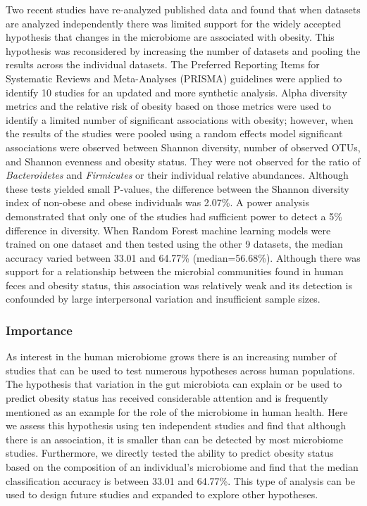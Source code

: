\documentclass[12pt,]{article}
\begin{document}
Two recent studies have re-analyzed published data and found that when
datasets are analyzed independently there was limited support for the
widely accepted hypothesis that changes in the microbiome are associated
with obesity. This hypothesis was reconsidered by increasing the number
of datasets and pooling the results across the individual datasets. The
Preferred Reporting Items for Systematic Reviews and Meta-Analyses
(PRISMA) guidelines were applied to identify 10 studies for an updated
and more synthetic analysis. Alpha diversity metrics and the relative
risk of obesity based on those metrics were used to identify a limited
number of significant associations with obesity; however, when the
results of the studies were pooled using a random effects model
significant associations were observed between Shannon diversity, number
of observed OTUs, and Shannon evenness and obesity status. They were not
observed for the ratio of \emph{Bacteroidetes} and \emph{Firmicutes} or
their individual relative abundances. Although these tests yielded small
P-values, the difference between the Shannon diversity index of
non-obese and obese individuals was 2.07\%. A power analysis
demonstrated that only one of the studies had sufficient power to detect
a 5\% difference in diversity. When Random Forest machine learning
models were trained on one dataset and then tested using the other 9
datasets, the median accuracy varied between 33.01 and 64.77\%
(median=56.68\%). Although there was support for a relationship between
the microbial communities found in human feces and obesity status, this
association was relatively weak and its detection is confounded by large
interpersonal variation and insufficient sample sizes.

\subsubsection{Importance}\label{importance}

As interest in the human microbiome grows there is an increasing number
of studies that can be used to test numerous hypotheses across human
populations. The hypothesis that variation in the gut microbiota can
explain or be used to predict obesity status has received considerable
attention and is frequently mentioned as an example for the role of the
microbiome in human health. Here we assess this hypothesis using ten
independent studies and find that although there is an association, it
is smaller than can be detected by most microbiome studies. Furthermore,
we directly tested the ability to predict obesity status based on the
composition of an individual's microbiome and find that the median
classification accuracy is between 33.01 and 64.77\%. This type of
analysis can be used to design future studies and expanded to explore
other hypotheses.
\end{document}
